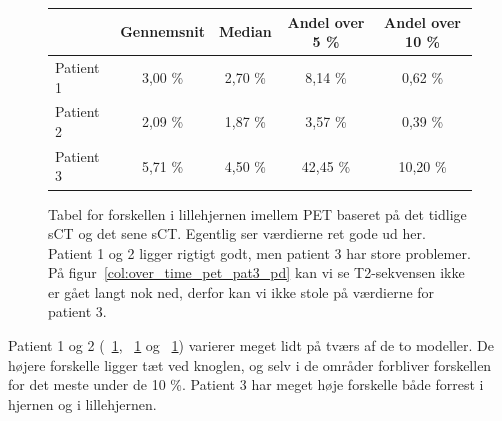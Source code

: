 \begin{figure}[H]
    \centering
    \begin{tabular}{| l | c | c | c | c |}
        \hline
         & Gennemsnit & Median & Andel over 5 \% & Andel over 10 \% \\ \hline
        Patient 1 & 3,00 \% & 2,70 \% & 8,14 \% & 0,62 \% \\ \hline
        Patient 2 & 2,09 \% & 1,87 \% & 3,57 \% & 0,39 \% \\ \hline
        Patient 3 & 5,71 \% & 4,50 \% & 42,45 \% & 10,20 \% \\ \hline
    \end{tabular}
    \caption{Tabel for forskellen i lillehjernen imellem PET baseret på det tidlige sCT og det sene sCT. Egentlig ser værdierne ret gode ud her. Patient 1 og 2 ligger rigtigt godt, men patient 3 har store problemer. På figur~\ref{col:over_time_pet_pat3_pd} kan vi se T2-sekvensen ikke er gået langt nok ned, derfor kan vi ikke stole på værdierne for patient 3.}
    \label{tab:over_tid_lillehjerne}
\end{figure}

Patient 1 og 2 (~\ref{tab:over_tid_lillehjerne},
~\ref{tab:over_tid_lillehjerne} og ~\ref{tab:over_tid_lillehjerne})
varierer meget lidt på tværs af de to modeller. De højere forskelle
ligger tæt ved knoglen, og selv i de områder forbliver forskellen for
det meste under de 10 \%. Patient 3 har meget høje forskelle både forrest
i hjernen og i lillehjernen. 
